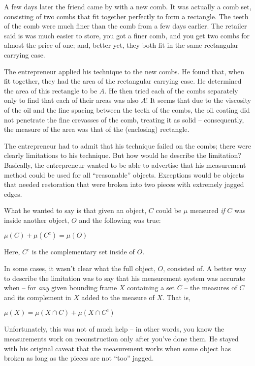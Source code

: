 \documentclass{article}
\begin{document}
A few days later the friend came by with a new comb. It was actually a comb 
set, consisting of two combs that fit together perfectly to form a rectangle.
The teeth of the comb were much finer than the comb from a few days earlier. 
The retailer said is was much easier to store, you got a finer comb, and you 
get two combs for almost the price of one; and, better yet, they both 
fit in the same rectangular carrying case.

The entrepreneur applied his technique to the new combs. 
He found that, when fit together, they had the area of the rectangular carrying case.
He determined the area of this rectangle to be $A$. He then tried each of the 
combs separately only to find that each of their areas was also $A$!
It seems that due to the viscosity of the oil and the fine spacing between the 
teeth of the combs, the oil coating did not penetrate the fine crevasses of the 
comb, treating it as solid -- consequently, the measure of the area was that of the (enclosing) rectangle.


The entrepreneur had to admit that his technique failed on the combs; 
there were clearly limitations to his technique. 
But how would he describe the limitation? Basically, the entrepreneur wanted to 
be able to advertise that his measurement method could be used for all ``reasonable'' objects. 
Exceptions would be objects that needed restoration that were broken into two pieces with extremely jagged edges.

What he wanted to say is that given an object, $C$ could be $\mu$ measured 
{\em if\/} $C$ was inside another object, $O$ and the following was true:

$\mu(C) + \mu(C^c) = \mu(O)$

Here, $C^c$ is the complementary set inside of $O$.

In some cases, it wasn't clear what the full object, $O$, consisted of. A better way 
to describe the limitation was to say that his measurement system was accurate 
when -- for {\em any\/} given bounding frame $X$ containing a set $C$ -- 
the measures of $C$ and 
its complement in $X$ added to the measure of $X$. That is,

$\mu(X) = \mu(X \cap C) + \mu(X \cap C^c)$

Unfortunately, this was not of much help -- in other words, you know the 
measurements work on reconstruction only after you've done them.
He stayed with his original caveat that the measurement works when some object has 
broken as long as the pieces are not ``too'' jagged.
\end{document}
